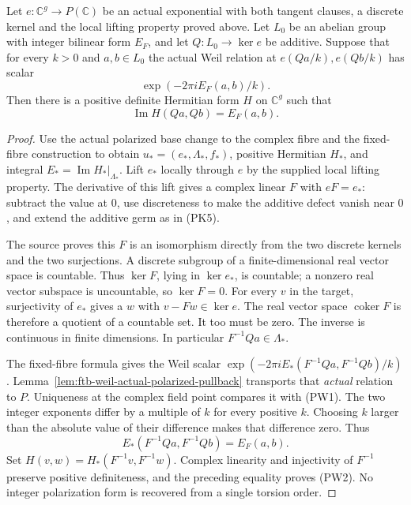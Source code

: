 \begin{proposition}
\label{prop:ftb-positive-form-from-actual-weil}
Let \(e:\mathbb C^g\to P(\mathbb C)\) be an actual
exponential with both tangent clauses, a discrete kernel
and the local lifting property proved above.
Let \(L_0\) be an abelian group with integer bilinear
form \(E_F\), and let \(Q:L_0\to\ker e\) be additive.
Suppose that for every \(k>0\) and \(a,b\in L_0\) the
actual Weil relation at
\(e(Qa/k),e(Qb/k)\) has scalar
\[
                         \exp(-2\pi i E_F(a,b)/k).          \tag{PW1}
\]
Then there is a positive definite Hermitian form \(H\)
on \(\mathbb C^g\) such that
\[
                         \operatorname{Im}H(Qa,Qb)=E_F(a,b).
                                                               \tag{PW2}
\]
\end{proposition}
\begin{proof}
Use the actual polarized base change to the complex
fibre and the fixed-fibre construction to obtain
\(u_*=(e_*,\Lambda_*,f_*)\), positive Hermitian \(H_*\),
and integral \(E_*=\operatorname{Im}H_*|_{\Lambda_*}\).
Lift \(e_*\) locally through \(e\) by the supplied local
lifting property.
The derivative of this lift gives a complex linear
\(F\) with \(eF=e_*\): subtract the value at \(0\),
use discreteness to make the additive defect vanish
near \(0\), and extend the additive germ as in (PK5).

The source proves this \(F\) is an isomorphism directly
from the two discrete kernels and the two surjections.
A discrete subgroup of a finite-dimensional real vector
space is countable.
Thus \(\ker F\), lying in \(\ker e_*\), is countable;
a nonzero real vector subspace is uncountable, so
\(\ker F=0\).
For every \(v\) in the target, surjectivity of \(e_*\)
gives a \(w\) with \(v-Fw\in\ker e\).
The real vector space \(\operatorname{coker}F\) is
therefore a quotient of a countable set.
It too must be zero.
The inverse is continuous in finite dimensions.
In particular \(F^{-1}Qa\in\Lambda_*\).

The fixed-fibre formula gives the Weil scalar
\(\exp(-2\pi i E_*(F^{-1}Qa,F^{-1}Qb)/k)\).
Lemma~\ref{lem:ftb-weil-actual-polarized-pullback}
transports that \emph{actual} relation to \(P\).
Uniqueness at the complex field point compares it
with (PW1).
The two integer exponents differ by a multiple of \(k\)
for every positive \(k\).
Choosing \(k\) larger than the absolute value of their
difference makes that difference zero.
Thus
\[
                 E_*(F^{-1}Qa,F^{-1}Qb)=E_F(a,b).
\]
Set \(H(v,w)=H_*(F^{-1}v,F^{-1}w)\).
Complex linearity and injectivity of \(F^{-1}\) preserve
positive definiteness, and the preceding equality proves
(PW2).
No integer polarization form is recovered from a single
torsion order.
\end{proof}

